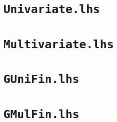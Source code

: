 \documentclass[11pt]{book}
\begin{document}
\section{\texttt{Univariate.lhs}}


\section{\texttt{Multivariate.lhs}}


\section{\texttt{GUniFin.lhs}}


\section{\texttt{GMulFin.lhs}}

\end{document}
